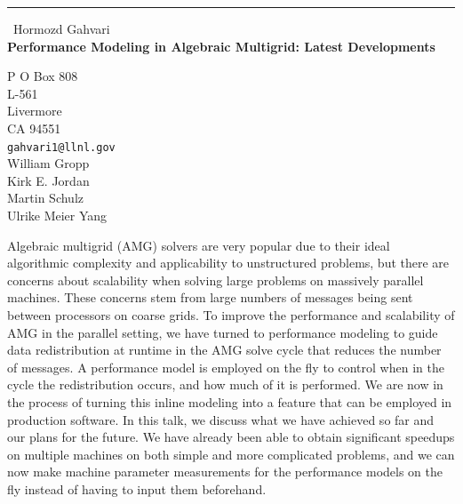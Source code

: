 \documentclass{report}
\begin{document}
\begin{center}
\rule{6in}{1pt} \
{\large Hormozd Gahvari \\
{\bf Performance Modeling in Algebraic Multigrid: Latest Developments}}

P O Box 808 \\ L-561 \\ Livermore \\ CA 94551
\\
{\tt gahvari1@llnl.gov}\\
William Gropp\\
Kirk E. Jordan\\
Martin Schulz\\
Ulrike Meier Yang\end{center}

Algebraic multigrid (AMG) solvers are very popular due to their ideal
algorithmic complexity and applicability to unstructured problems, but
there are concerns about scalability when solving large problems on
massively parallel machines. These concerns stem from large numbers of
messages being sent between processors on coarse grids. To improve the
performance and scalability of AMG in the parallel setting, we have
turned to performance modeling to guide data redistribution at runtime in
the AMG solve cycle that reduces the number of messages. A performance
model is employed on the fly to control when in the cycle the
redistribution occurs, and how much of it is performed. We are now in the
process of turning this inline modeling into a feature that can be
employed in production software. In this talk, we discuss what we have
achieved so far and our plans for the future. We have already been able
to obtain significant speedups on multiple machines on both simple and
more complicated problems, and we can now make machine parameter
measurements for the performance models on the fly instead of having to
input them beforehand.
\end{document}
